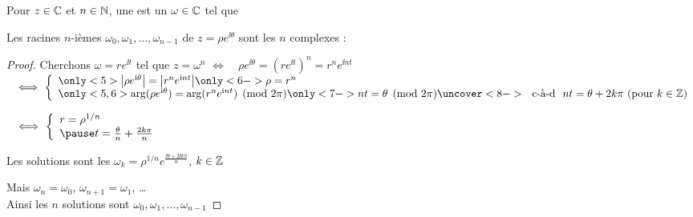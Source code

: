 \begin{frame}

Pour $z \in \mathbb{C}$ et $n \in \mathbb{N}$, une  est
un $\omega \in \mathbb{C}$ tel que

\pause

Les racines $n$-ièmes $\omega_0, \omega_1, \ldots, \omega_{n - 1}$ 
de $z=\rho e^{\ii  \theta}$ sont les $n$ complexes :
     \vspace{-0.5em}

\pause


\begin{proof}
Cherchons $\omega=re^{\ii t}$ tel que $z=\omega^n$ \hspace{3ex}
\pause
$\Longleftrightarrow\quad \rho e^{\ii \theta}  = \left(re^{\ii t}\right)^n 
= r^n e^{\ii nt}$\\
\pause
$\quad\Longleftrightarrow\ 
\left\{\begin{array}{l}
\only<5>{\left|\rho e^{\ii \theta} \right| =  \left|r^n e^{\ii nt}\right|}
\only<6->{\rho = r^n}\\
\only<5,6>{\arg(\rho e^{\ii \theta}) = \arg(r^n e^{\ii nt}) \pmod {2\pi} }
\only<7->{nt = \theta \pmod {2\pi}} 
\uncover<8->{ \ \textrm{ c-à-d } \  nt = \theta + 2k\pi \textrm{ (pour $k\in\Zz$)} }
\end{array}\right.$
\pause
\pause
\pause
 \pause

$\quad\Longleftrightarrow\ 
\left\{\begin{array}{l}
r = \rho^{1/n}\\
\pause
t = \frac{\theta}{n} + \frac{2k\pi}{n}
\end{array}\right.$

\pause

Les solutions sont les $\omega_k = \rho^{1/n} e^{\frac{\ii\theta + 2\ii k\pi}{n}}$, $k\in\mathbb{Z}$ 

\pause

Mais $\omega_n=\omega_0$, $\omega_{n+1}=\omega_1$, \ldots\\
Ainsi les $n$ solutions sont $\omega_0,\omega_1,\ldots,\omega_{n-1}$

\end{proof}

\end{frame}


